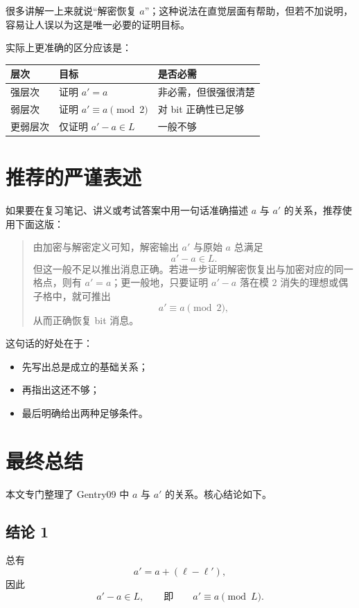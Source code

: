\documentclass[12pt,a4paper]{article}
\begin{document}
很多讲解一上来就说“解密恢复 \(a\)”；这种说法在直觉层面有帮助，但若不加说明，容易让人误以为这是唯一必要的证明目标。

实际上更准确的区分应该是：

\begin{center}
\begin{tabular}{lll}
\toprule
层次 & 目标 & 是否必需 \\
\midrule
强层次 & 证明 \(a'=a\) & 非必需，但很强很清楚 \\
弱层次 & 证明 \(a'\equiv a\pmod 2\) & 对 bit 正确性已足够 \\
更弱层次 & 仅证明 \(a'-a\in L\) & 一般不够 \\
\bottomrule
\end{tabular}
\end{center}

\section{推荐的严谨表述}

如果要在复习笔记、讲义或考试答案中用一句话准确描述 \(a\) 与 \(a'\) 的关系，推荐使用下面这版：

\begin{quote}
由加密与解密定义可知，解密输出 \(a'\) 与原始 \(a\) 总满足
\[
a'-a\in L.
\]
但这一般不足以推出消息正确。若进一步证明解密恢复出与加密对应的同一格点，则有 \(a'=a\)；更一般地，只要证明 \(a'-a\) 落在模 \(2\) 消失的理想或偶子格中，就可推出
\[
a' \equiv a \pmod 2,
\]
从而正确恢复 bit 消息。
\end{quote}

这句话的好处在于：

\begin{itemize}[leftmargin=2em]
    \item 先写出总是成立的基础关系；
    \item 再指出这还不够；
    \item 最后明确给出两种足够条件。
\end{itemize}

\section{最终总结}

本文专门整理了 Gentry09 中 \(a\) 与 \(a'\) 的关系。核心结论如下。

\subsection*{结论 1}
总有
\[
a' = a + (\ell-\ell'),
\]
因此
\[
a'-a \in L,
\qquad\text{即}\qquad
a' \equiv a \pmod L.
\]
\end{document}
